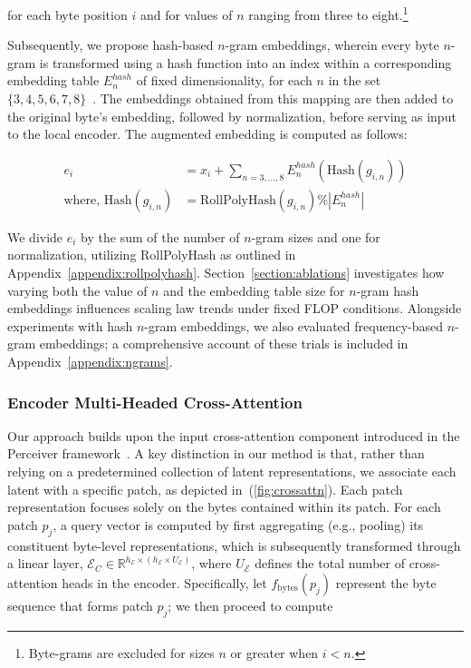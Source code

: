 for each byte position $i$ and for values of $n$ ranging from three to eight.\footnote{
Byte-grams are excluded for sizes $n$ or greater when $i < n$.}

Subsequently, we propose hash-based $n$-gram embeddings, wherein every byte $n$-gram is transformed using a hash function into an index within a corresponding embedding table $E_{n}^{hash}$ of fixed dimensionality, for each $n$ in the set $\{3,4,5,6,7,8\}$~\citep{bai2010learning}.
The embeddings obtained from this mapping are then added to the original byte’s embedding, followed by normalization, before serving as input to the local encoder. The augmented embedding is computed as follows:

\begin{align}
e_i &= x_i + \sum_{n = 3,...,8}E_{n}^{hash}(\text{Hash}(g_{i,n})) \\
\text{where, Hash}(g_{i,n}) &= \text{RollPolyHash}(g_{i,n}) \% |E_{n}^{hash}|
\end{align}

We divide $e_i$ by the sum of the number of $n$-gram sizes and one for normalization, utilizing RollPolyHash as outlined in Appendix~\ref{appendix:rollpolyhash}. Section~\ref{section:ablations} investigates how varying both the value of $n$ and the embedding table size for $n$-gram hash embeddings influences scaling law trends under fixed FLOP conditions. Alongside experiments with hash $n$-gram embeddings, we also evaluated frequency-based $n$-gram embeddings; a comprehensive account of these trials is included in Appendix~\ref{appendix:ngrams}.

\subsubsection{Encoder Multi-Headed Cross-Attention}
\label{sec:enc-cross-attn}
Our approach builds upon the input cross-attention component introduced in the Perceiver framework~\citep{jaegle2021perceiver}. A key distinction in our method is that, rather than relying on a predetermined collection of latent representations, we associate each latent with a specific patch, as depicted in~(\autoref{fig:crossattn}). Each patch representation focuses solely on the bytes contained within its patch. For each patch $p_j$, a query vector is computed by first aggregating (e.g., pooling) its constituent byte-level representations, which is subsequently transformed through a linear layer, $\mathcal{E}_{C} \in \mathbb{R}^{h_{\mathcal{E}} \times (h_{\mathcal{E}} \times U_{\mathcal{E}})}$, where $U_{\mathcal{E}}$ defines the total number of cross-attention heads in the encoder. Specifically, let $f_{\text{bytes}}(p_j)$ represent the byte sequence that forms patch $p_j$; we then proceed to compute

